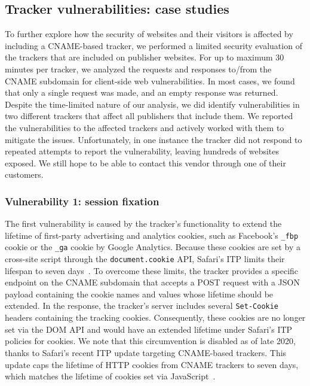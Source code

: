 \subsection{Tracker vulnerabilities: case studies}
To further explore how the security of websites and their visitors is affected by including a CNAME-based tracker, we performed a limited security evaluation of the trackers that are included on publisher websites.
For up to maximum 30 minutes per tracker, we analyzed the requests and responses to/from the CNAME subdomain for client-side web vulnerabilities.
In most cases, we found that only a single request was made, and an empty response was returned.
Despite the time-limited nature of our analysis, we did identify vulnerabilities in two different trackers that affect all publishers that include them.
We reported the vulnerabilities to the affected trackers and actively worked with them to mitigate the issues.
Unfortunately, in one instance the tracker did not respond to repeated attempts to report the vulnerability, leaving hundreds of websites exposed.
We still hope to be able to contact this vendor through one of their customers.

\subsubsection{Vulnerability 1: session fixation} The first vulnerability is caused by the tracker's functionality to extend the lifetime of first-party advertising and analytics cookies, such as Facebook's \texttt{\_fbp} cookie or the \texttt{\_ga} cookie by Google Analytics. 
Because these cookies are set by a cross-site script through the \texttt{document.cookie} API, Safari's ITP 
limits their lifespan to seven days~\cite{safari-itp-21}.
To overcome these limits, the tracker provides a specific endpoint on the CNAME subdomain that accepts a POST request with a JSON payload containing the cookie names and values whose lifetime should be extended.
In the response, the tracker's server includes several \texttt{Set-Cookie} headers containing the tracking cookies.
Consequently, these cookies are no longer set via the DOM API and would have an extended lifetime under Safari's ITP policies for cookies. We note that this circumvention is disabled as of late 2020, thanks to Safari's recent ITP update targeting CNAME-based trackers. This update caps the lifetime of HTTP cookies from CNAME trackers to seven days, which matches the lifetime of cookies set via JavaScript~\cite{safari-cname-defense}.

